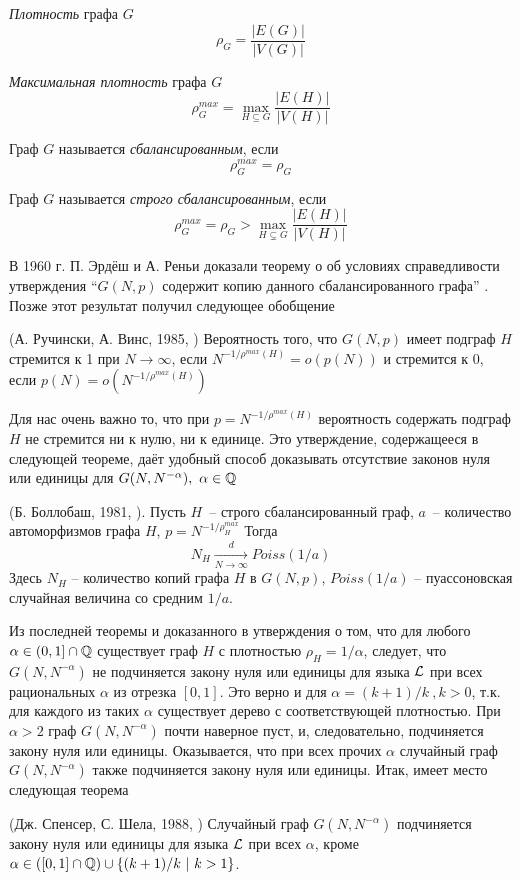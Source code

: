     \Def \textit{Плотность} графа $G$ 
   \[ \rho_G = \frac {|E(G)|}{|V(G)|} \]
   
   \Def \textit{Максимальная плотность} графа $G$
     \[ \rho^{max}_G = \max_{H \subseteq G} \frac {|E(H)|}{|V(H)|} \]
    
    \Def Граф $G$ называется \textit{сбалансированным}, если 
    \[ \rho^{max}_G = \rho_G \]
    
    \Def Граф $G$ называется \textit{строго сбалансированным}, если 
    \[\rho^{max}_G = \rho_G > \max_{H \subsetneq G} \frac {|E(H)|}{|V(H)|} \]
     
В 1960 г. П. Эрдёш и А. Реньи
доказали теорему о об условиях справедливости утверждения “$G(N, p)$ содержит копию данного сбалансированного графа” \cite{erdHos1976evolution}. 
Позже этот результат получил следующее обобщение
    
\begin{theorem} (А. Ручински, А. Винс, 1985, \cite{rucinski1985balanced}) 
\label{th:ruchinski}
Вероятность того, что $G(N, p)$ имеет подграф $H$ стремится к 1 при $N \rightarrow \infty$, если $N^{-1/\rho^{max}(H)} = o(p(N))$ и стремится к  0, если $p(N) = o\left(N^{-1/\rho^{max}(H)}\right)$

\end{theorem}

Для нас очень важно то, что при $p = N^{-1/\rho^{max}(H)}$ вероятность содержать подграф $H$ не стремится ни к нулю, ни к единице.
Это утверждение, содержащееся в следующей теореме, даёт удобный способ доказывать отсутствие законов нуля или единицы для $G(N, N^{-\alpha}), ~\alpha \in \mathbb {Q}$

\begin{theorem} (Б. Боллобаш, 1981, \cite{bollobas1981threshold}). Пусть $H$~-- строго сбалансированный граф, $a$~-- количество автоморфизмов графа $H$, $p = N^{-1/ \rho^{max}_H}$
Тогда
\[N_H \xrightarrow[N\rightarrow \infty]{d} Poiss(1/a) \]
Здесь $N_H$ -- количество копий графа $H$ в $G(N, p)$, $Poiss(1/a)$ -- пуассоновская случайная величина со средним $1/a$.
\end{theorem}
Из последней теоремы и доказанного в \cite{rucinski1986strongly} утверждения о том, что для любого $\alpha \in (0,1] \cap \mathbb {Q}$ существует граф $H$ с плотностью $\rho_H = 1/\alpha$, следует, что $G(N,N^{-\alpha})$ не подчиняется закону нуля или единицы для языка $\mathcal{L}$ при всех рациональных $\alpha$ из отрезка $[0,1]$.
Это верно и для $\alpha = (k+1)/k~, k > 0$, т.к. для каждого из таких $\alpha$ существует дерево с соответствующей плотностью.
При $\alpha > 2$ граф $G(N, N^{-\alpha})$ почти наверное пуст, и, следовательно, подчиняется закону нуля или единицы.
Оказывается, что при всех прочих $\alpha$ случайный граф $G(N, N^{-\alpha})$ также подчиняется закону нуля или единицы.
Итак, имеет место следующая теорема
\begin{theorem} (Дж. Спенсер, С. Шела, 1988, \cite{shelah1988zero})
Случайный граф $G(N, N^{-\alpha})$ подчиняется закону нуля или единицы для языка $\mathcal{L}$ при всех $\alpha$, кроме $\alpha \in \left([0,1] \cap \mathbb {Q} \right) \cup \{(k+1)/k ~|~ k > 1\}$.
\end{theorem}

